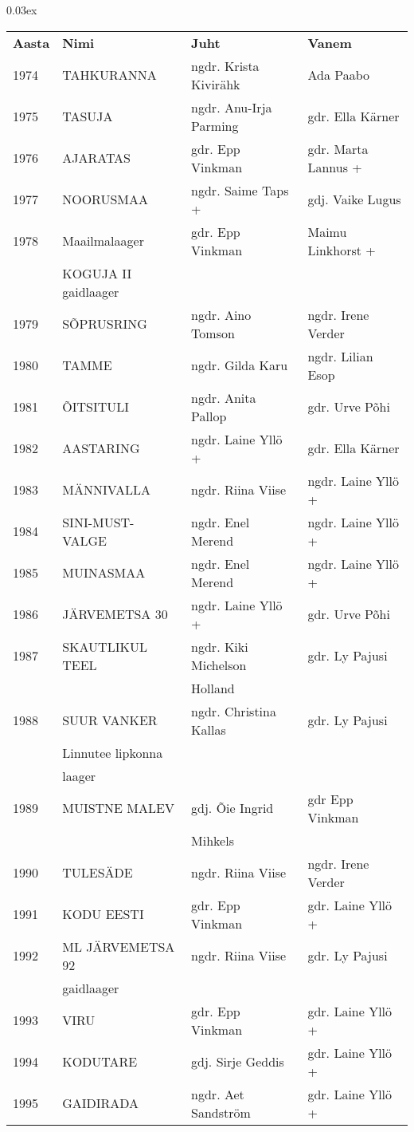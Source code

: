 \documentclass[10pt]{book}
\begin{document}
{\centering\scriptsize\arrayrulewidth 0.03ex
\begin{tabular*}{1.0\textwidth}{@{\extracolsep{\fill}}@{}l@{}@{}l@{}@{}l@{}@{}l@{}}
\bf{Aasta}	&	\bf{Nimi}				&	\bf{Juht}				&	\bf{Vanem}\\[2mm]
	1974	&	TAHKURANNA				&	ngdr. Krista Kivir\"ahk	&	Ada Paabo\\[2mm]
	1975	&	TASUJA					&	ngdr. Anu-Irja Parming	&	gdr. Ella K\"arner\\[2mm]
	1976	&	AJARATAS				&	gdr. Epp Vinkman		&	gdr. Marta Lannus +\\[2mm]
	1977	&	NOORUSMAA				&	ngdr. Saime Taps +		&	gdj. Vaike Lugus\\[2mm]
	1978	&	Maailmalaager 			&	gdr. Epp Vinkman		&	Maimu Linkhorst +\\
			&	KOGUJA II gaidlaager	&							&	\\[2mm]
	1979	&	S\~OPRUSRING			&	ngdr. Aino Tomson		&	ngdr. Irene Verder\\[2mm]
	1980	&	TAMME					&	ngdr. Gilda Karu		&	ngdr. Lilian Esop\\[2mm]
	1981	&	\~OITSITULI				&	ngdr. Anita Pallop		&	gdr. Urve P\~ohi\\[2mm]
	1982	&	AASTARING				&	ngdr. Laine Yll\"o +	&	gdr. Ella K\"arner\\[2mm]
	1983	&	M\"ANNIVALLA			&	ngdr. Riina Viise		&	ngdr. Laine Yll\"o +\\[2mm]
	1984	&	SINI-MUST-VALGE			&	ngdr. Enel Merend		&	ngdr. Laine Yll\"o +\\[2mm]
	1985	&	MUINASMAA				&	ngdr. Enel Merend		&	ngdr. Laine Yll\"o +\\[2mm]
	1986	&	J\"ARVEMETSA 30			&	ngdr. Laine Yll\"o +	&	gdr. Urve P\~ohi\\[2mm]
	1987	&	SKAUTLIKUL TEEL			&	ngdr. Kiki Michelson 	&	gdr. Ly Pajusi\\
			&							&	Holland					&	\\[2mm]
	1988	&	SUUR VANKER				&	ngdr. Christina Kallas	&	gdr. Ly Pajusi\\
			&	Linnutee lipkonna 		&							&	\\
			&	laager					&							&	\\[2mm]
	1989	&	MUISTNE MALEV			&	gdj. \~Oie Ingrid 		&	gdr Epp Vinkman\\
			&							&	Mihkels					&	\\[2mm]
	1990	&	TULES\"ADE				&	ngdr. Riina Viise		&	ngdr. Irene Verder\\[2mm]
	1991	&	KODU EESTI				&	gdr. Epp Vinkman		&	gdr. Laine Yll\"o +\\[2mm]
	1992	&	ML J\"ARVEMETSA 92		&	ngdr. Riina Viise		&	gdr. Ly Pajusi\\
			&	gaidlaager				&							&	\\[2mm]
	1993	&	VIRU					&	gdr. Epp Vinkman		&	gdr. Laine Yll\"o +\\[2mm]
	1994	&	KODUTARE				&	gdj. Sirje Geddis		&	gdr. Laine Yll\"o +\\[2mm]
	1995	&	GAIDIRADA				&	ngdr. Aet Sandstr\"om	&	gdr. Laine Yll\"o +\\[2mm]
\end{tabular*}}
\end{document}
